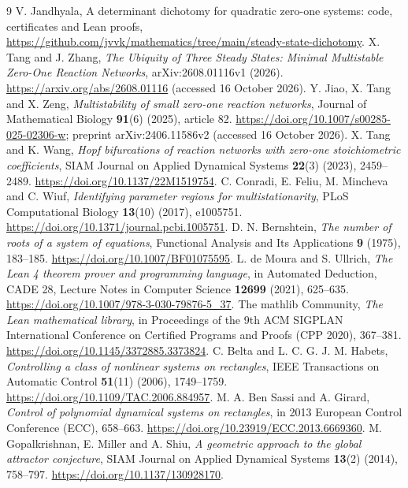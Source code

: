 \documentclass[11pt]{article}
\theoremstyle{remark}\newtheorem{remark}[theorem]{Remark}
\begin{document}
\begin{thebibliography}{9}
 V. Jandhyala, A determinant dichotomy for quadratic zero-one systems: code,
certificates and Lean proofs,
\url{https://github.com/jvvk/mathematics/tree/main/steady-state-dichotomy}.
 X. Tang and J. Zhang,
\emph{The Ubiquity of Three Steady States: Minimal Multistable Zero-One Reaction Networks},
arXiv:2608.01116v1 (2026). \url{https://arxiv.org/abs/2608.01116}
(accessed 16 October 2026).
 Y. Jiao, X. Tang and X. Zeng,
\emph{Multistability of small zero-one reaction networks}, Journal of Mathematical
Biology \textbf{91}(6) (2025), article 82.
\url{https://doi.org/10.1007/s00285-025-02306-w}; preprint arXiv:2406.11586v2
(accessed 16 October 2026).
 X. Tang and K. Wang, \emph{Hopf bifurcations of reaction networks with
zero-one stoichiometric coefficients}, SIAM Journal on Applied Dynamical Systems
\textbf{22}(3) (2023), 2459--2489. \url{https://doi.org/10.1137/22M1519754}.
 C. Conradi, E. Feliu, M. Mincheva and C. Wiuf,
\emph{Identifying parameter regions for multistationarity}, PLoS Computational
Biology \textbf{13}(10) (2017), e1005751.
\url{https://doi.org/10.1371/journal.pcbi.1005751}.
 D. N. Bernshtein,
\emph{The number of roots of a system of equations}, Functional Analysis and
Its Applications \textbf{9} (1975), 183--185.
\url{https://doi.org/10.1007/BF01075595}.
 L. de Moura and S. Ullrich,
\emph{The Lean 4 theorem prover and programming language}, in Automated
Deduction, CADE 28, Lecture Notes in Computer Science \textbf{12699} (2021),
625--635. \url{https://doi.org/10.1007/978-3-030-79876-5_37}.
 The mathlib Community,
\emph{The Lean mathematical library}, in Proceedings of the 9th ACM SIGPLAN
International Conference on Certified Programs and Proofs (CPP 2020), 367--381.
\url{https://doi.org/10.1145/3372885.3373824}.
 C. Belta and L. C. G. J. M. Habets,
\emph{Controlling a class of nonlinear systems on rectangles}, IEEE Transactions
on Automatic Control \textbf{51}(11) (2006), 1749--1759.
\url{https://doi.org/10.1109/TAC.2006.884957}.
 M. A. Ben Sassi and A. Girard,
\emph{Control of polynomial dynamical systems on rectangles}, in 2013 European
Control Conference (ECC), 658--663. \url{https://doi.org/10.23919/ECC.2013.6669360}.
 M. Gopalkrishnan, E. Miller and A. Shiu,
\emph{A geometric approach to the global attractor conjecture}, SIAM Journal on
Applied Dynamical Systems \textbf{13}(2) (2014), 758--797.
\url{https://doi.org/10.1137/130928170}.

\end{thebibliography}
\end{document}
